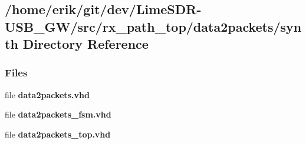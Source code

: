 \subsection{/home/erik/git/dev/\+Lime\+S\+D\+R-\/\+U\+S\+B\+\_\+\+G\+W/src/rx\+\_\+path\+\_\+top/data2packets/synth Directory Reference}
\label{dir_6d7d1e806cc55049b660c9a8e18feb7f}
\subsubsection*{Files}
\begin{DoxyCompactItemize}
\item 
file {\bf data2packets.\+vhd}
\item 
file {\bf data2packets\+\_\+fsm.\+vhd}
\item 
file {\bf data2packets\+\_\+top.\+vhd}
\end{DoxyCompactItemize}
